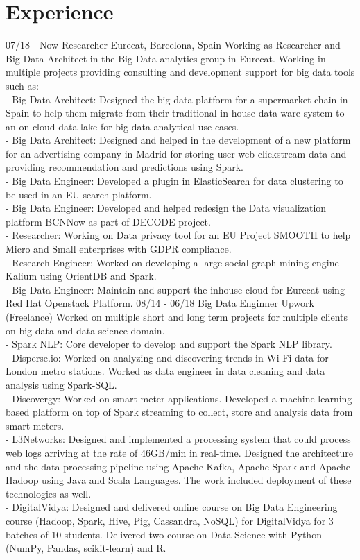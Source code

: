 \documentclass[]{friggeri-cv}
\begin{document}
	\section{Experience}
	\begin{entrylist}
	 \entry
	{07/18 - Now}
	{Researcher}
	{Eurecat, Barcelona, Spain}
	{Working as Researcher and Big Data Architect in the Big Data analytics group in Eurecat. Working in multiple projects providing consulting and development support for big data tools such as: \\
	- Big Data Architect: Designed the big data platform for a supermarket chain in Spain to help them migrate from their traditional in house data ware system to an on cloud data lake for big data analytical
	use cases.
	\\- Big Data Architect: Designed and helped in the development of a new platform for an advertising company in Madrid for storing user web clickstream data and providing recommendation and predictions using Spark.
	\\- Big Data Engineer: Developed a plugin in ElasticSearch for data clustering to be used in an EU search platform.
	\\- Big Data Engineer: Developed and helped redesign the Data visualization platform BCNNow as part
	of DECODE project.
	\\- Researcher: Working on Data privacy tool for an EU Project SMOOTH to help Micro and Small
	enterprises with GDPR compliance.
	\\- Research Engineer: Worked on developing a large social graph mining engine Kalium using OrientDB
	and Spark.
	\\- Big Data Engineer: Maintain and support the inhouse cloud for Eurecat using Red Hat Openstack
	Platform.}
	\entry
	{08/14 - 06/18}
	{Big Data Enginner}
	{Upwork (Freelance)}
	{ Worked on multiple short and long term projects for multiple clients on big data and data science domain.\\
		- Spark NLP: Core developer to develop and support the Spark NLP library.\\
		- Disperse.io: Worked on analyzing and discovering trends in Wi-Fi data for London metro stations. Worked as data engineer in data cleaning and data analysis using Spark-SQL.\\
		- Discovergy: Worked on smart meter applications. Developed a machine learning based platform on top of Spark streaming to collect, store and analysis data from smart meters. \\
		- L3Networks: Designed and implemented a processing system that could process web logs arriving at the rate of 46GB/min in real-time. Designed the architecture and the data processing pipeline using Apache Kafka, Apache Spark and Apache Hadoop using Java and Scala Languages. The work included deployment of these technologies as well.\\
		- DigitalVidya: Designed and delivered online course on Big Data Engineering course (Hadoop, Spark, Hive, Pig, Cassandra, NoSQL) for DigitalVidya for 3 batches of 10 students. Delivered two course on Data Science with Python (NumPy, Pandas, scikit-learn) and R.\\
	}		
\end{entrylist}
\end{document}
